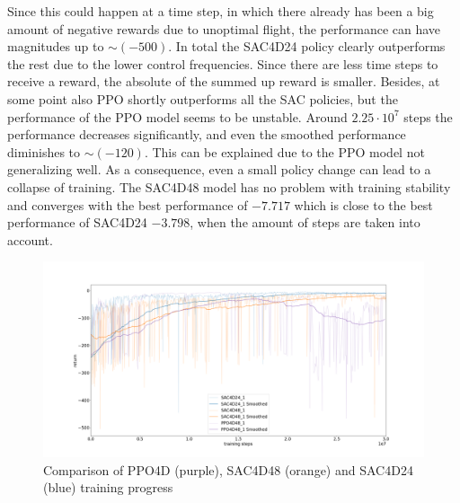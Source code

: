 Since this could happen at a time step, in which there already has been a 
big amount of negative rewards due to unoptimal flight, the performance can 
have magnitudes up to $\sim (-500)$.
In total the SAC4D24 policy clearly outperforms the rest due to the lower
control frequencies. Since there are less time steps to receive a reward,
the absolute of the summed up reward is smaller.
Besides, at some point also PPO shortly outperforms all the SAC policies,
but the performance of the PPO model seems to be unstable.
Around $2.25 \cdot 10^7$ steps the performance decreases significantly, and
even the smoothed performance diminishes to $\sim (-120)$. 
This can be explained due to the PPO model not generalizing well. As a consequence,
even a small policy change can lead to a collapse of training.
The SAC4D48 model has no problem with training stability and converges with the best
performance of $-7.717$ which is close to the best performance of SAC4D24 $-3.798$, 
when the amount of steps are taken into account.

\begin{figure}
	\centering
	\includegraphics[width=\linewidth]{figures/4Dtrain.png}
	\caption{Comparison of PPO4D (purple), SAC4D48 (orange) and SAC4D24
	 (blue) training progress}
	\label{fig:train4D}
\end{figure}

